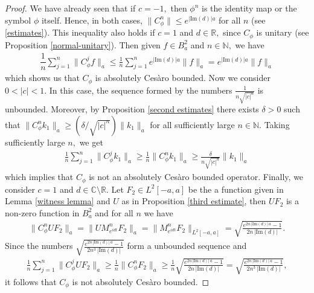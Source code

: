 \documentclass[11pt]{amsart}%
\numberwithin{equation}{section}
\theoremstyle{plain}
\theoremstyle{definition}
\theoremstyle{definition}
\begin{document}
\begin{proof} We have already seen that if $c = -1,$ then $\phi^n$ is the identity map or the symbol $\phi$ itself. Hence, in both cases, $\|C_{\phi}^n\|\leq e^{|\mathrm{Im}(d)|a}$ for all $n$ (see \eqref{estimates}). This inequality also holds if $c=1$ and $d\in \mathbb{R},$ since $C_{\phi}$ is unitary (see Proposition \ref{normal-unitary}). Then given $f\in B^2_a$ and $n\in \mathbb{N},$ we have
\begin{align*}
 \dfrac{1}{n}\sum_{j=1}^{n}\|C^j_{\phi}f\|_{a}\leq \frac{1}{n}\sum_{j=1}^ne^{|\mathrm{Im}(d)|a}\|f\|_a=e^{|\mathrm{Im}(d)|a}\|f\|_a
\end{align*}
which shows us that $C_{\phi}$ is absolutely Ces\`aro bounded. Now we  consider $0<|c|<1.$ In this case, the sequence formed by the numbers $\frac{1}{n\sqrt{|c|^n}}$ is unbounded. Moreover,  by Proposition \ref{second estimates} there exists $\delta > 0$ such that $\|C^{n}_{\phi}k_1\|_{a} \geq (\delta/\sqrt{|c|^n})\|k_1\|_{a}$ for all sufficiently large $n \in \mathbb{N}.$ Taking sufficiently large $n,$ we get
\begin{align*}
\frac{1}{n}\sum_{j=1}^{n}\|C^{j}_{\phi}k_1\|_{a}\geq \frac{1}{n}\|C_{\phi}^nk_1\|_{a}\geq  \frac{\delta}{n\sqrt{|c|^n}}\|k_1\|_{a}
\end{align*}
which implies that $C_{\phi}$ is not an absolutely Cesàro bounded operator. Finally, we consider $c=1$ and $d\in\mathbb{C}\setminus\mathbb{R}.$ Let $F_2\in L^2[-a,a]$ be the a function given in Lemma \ref{witness lemma} and 
$U$ as in Proposition \ref{third estimate}, then $UF_2$ is a non-zero function in $B^2_a$ and for all $n$ we have
\begin{align*}
\|C_{\phi}^nUF_2\|_a=\|UM_{e^{idt}}^nF_2\|_{a}=\|M_{e^{idt}}^nF_2\|_{L^2[-a,a]}=\sqrt{\frac{e^{2n\,|\mathrm{Im}(d)|\,a}-1}{2n\,|\mathrm{Im}(d)|}}.
\end{align*}
Since the numbers $\sqrt{\frac{e^{2n\,|\mathrm{Im}(d)|\,a}-1}{2n^3\,|\mathrm{Im}(d)|}}$ form a unbounded sequence and 
\begin{align*}
\frac{1}{n}\sum_{j=1}^{n}\|C_{\phi}^{j}UF_2\|_{a}\geq \frac{1}{n}\|C_{\phi}^{n}F_2\|_{a}\geq\frac{1}{n}\sqrt{\frac{e^{2n\,|\mathrm{Im}(d)|\,a}-1}{2n\,|\mathrm{Im}(d)|}}=\sqrt{\frac{e^{2n\,|\mathrm{Im}(d)|\,a}-1}{2n^3\,|\mathrm{Im}(d)|}},
\end{align*}
it follows that $C_{\phi}$ is not absolutely Ces\`aro bounded. 
\end{proof}

\printbibliography


	
	
	
\end{document}
